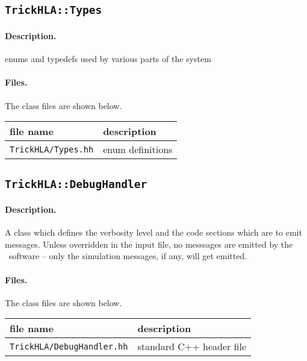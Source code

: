 \subsection{{\tt TrickHLA::Types}}

\paragraph{Description.}
enums and typedefs used by various parts of the system

\paragraph{Files.}
The class files are shown below.
   
{
  \scriptsize
  \begin{tabular}{|l|l|} 
    \hline
    file name & description \\
    \hline \hline
    {\tt TrickHLA/Types.hh} 
    & enum definitions
    \\ \hline
  \end{tabular}
}

\subsection{{\tt TrickHLA::DebugHandler}}

\paragraph{Description.}
A class which defines the verbosity level and the code sections which are to emit
messages. Unless overridden in the input file, no messsages are emitted by the
\TrickHLA\ software -- only the simulation messages, if any, will get emitted.

\paragraph{Files.}
The class files are shown below.
   
{
  \scriptsize
  \begin{tabular}{|l|l|} 
    \hline
    file name & description \\
    \hline \hline
    {\tt TrickHLA/DebugHandler.hh} 
    & standard C++ header file
    \\ \hline
  \end{tabular}
}


